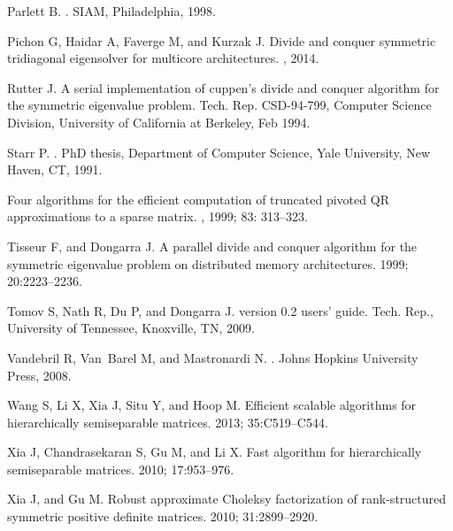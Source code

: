 \documentclass[times]{nlaauth}
\newcounter{algorithm}
\begin{document}
\begin{thebibliography}{99}
{  Parlett B.}
.
\newblock SIAM, Philadelphia, 1998.



{  Pichon G, Haidar A, Faverge M, and Kurzak J.}
\newblock Divide and conquer symmetric tridiagonal eigensolver for multicore architectures.
, 2014.

{  Rutter J.}
\newblock A serial implementation of cuppen's divide and conquer algorithm for
  the symmetric eigenvalue problem.
\newblock Tech. Rep. CSD-94-799, Computer Science Division, University of
  California at Berkeley, Feb 1994.

{  Starr P.}
.
\newblock PhD thesis, Department of Computer Science, Yale University, New
  Haven, CT, 1991.

\newblock Four algorithms for the efficient computation of truncated pivoted {QR} approximations to a sparse matrix.
, 1999; 83: 313--323.

{  Tisseur F, and Dongarra J.}
\newblock A parallel divide and conquer algorithm for the symmetric eigenvalue
problem on distributed memory architectures.
 1999; 20:2223--2236.

{  Tomov S, Nath R, Du P, and Dongarra J.}
 version 0.2 users' guide.
\newblock Tech. Rep., University of Tennessee, Knoxville, TN, 2009.

{  Vandebril R, Van~Barel M, and Mastronardi N.}
.
\newblock Johns Hopkins University Press, 2008.

{  Wang S, Li X, Xia J, Situ Y, and Hoop M.}
\newblock Efficient scalable algorithms for hierarchically semiseparable
  matrices.
 2013; 35:C519--C544.

{  Xia J, Chandrasekaran S, Gu M, and Li X.}
\newblock Fast algorithm for hierarchically semiseparable matrices.
 2010;  17:953--976.

{  Xia J, and Gu M.}
\newblock Robust approximate {Choleksy} factorization of rank-structured
  symmetric positive definite matrices.
 2010;  31:2899--2920.




\end{thebibliography}
\end{document}
